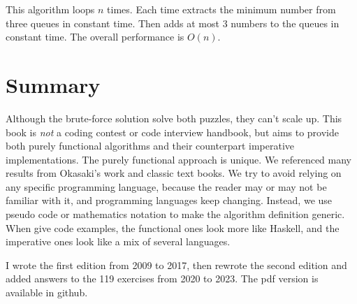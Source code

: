\documentclass[b5paper]{article}
\begin{document}
This algorithm loops $n$ times. Each time extracts the minimum number from three queues in constant time. Then adds at most 3 numbers to the queues in constant time. The overall performance is $O(n)$.

\section*{Summary}
Although the brute-force solution solve both puzzles, they can't scale up. This book is {\em not} a coding contest or code interview handbook, but aims to provide both purely functional algorithms and their counterpart imperative implementations. The purely functional approach is unique. We referenced many results from Okasaki's work\cite{okasaki-book} and classic text books\cite{CLRS}. We try to avoid relying on any specific programming language, because the reader may or may not be familiar with it, and programming languages keep changing. Instead, we use pseudo code or mathematics notation to make the algorithm definition generic. When give code examples, the functional ones look more like Haskell, and the imperative ones look like a mix of several languages.

I wrote the first edition from 2009 to 2017, then rewrote the second edition and added answers to the 119 exercises from 2020 to 2023. The pdf version is available in github.

\begin{Exercise}\label{ex:preface}


\end{Exercise}
\end{document}
